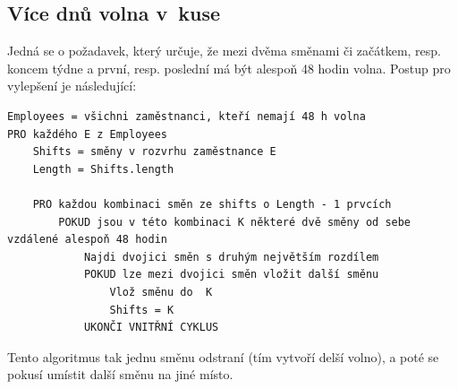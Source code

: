\documentclass[twoside]{ctuthesis}
\begin{document}
\subsection{Více dnů volna v~kuse}
Jedná se o požadavek, který určuje, že mezi dvěma směnami či začátkem, resp. koncem týdne a první, resp. poslední má být alespoň 48 hodin volna. Postup pro vylepšení je následující:

\begin{lstlisting}[caption={Pseudokód pro vylepšování obsazení specializovaných směn}]
Employees = všichni zaměstnanci, kteří nemají 48 h volna
PRO každého E z Employees
	Shifts = směny v rozvrhu zaměstnance E
	Length = Shifts.length

	PRO každou kombinaci směn ze shifts o Length - 1 prvcích
		POKUD jsou v této kombinaci K některé dvě směny od sebe vzdálené alespoň 48 hodin
			Najdi dvojici směn s druhým největším rozdílem
			POKUD lze mezi dvojici směn vložit další směnu
				Vlož směnu do  K
				Shifts = K
			UKONČI VNITŘNÍ CYKLUS
\end{lstlisting}

Tento algoritmus tak jednu směnu odstraní (tím vytvoří delší volno), a poté se pokusí umístit další směnu na jiné místo.

\end{document}

